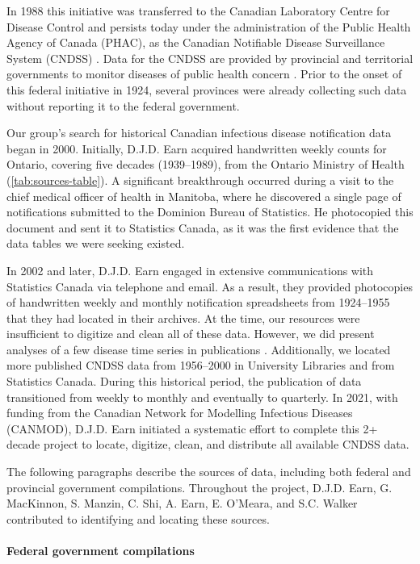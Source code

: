\documentclass[12pt]{article}
\begin{document}
In 1988 this initiative was transferred to the Canadian Laboratory Centre for Disease Control and persists today under the administration of the Public Health Agency of Canada (PHAC), as the Canadian Notifiable Disease Surveillance System (CNDSS) \cite{totten2019updates}. Data for the CNDSS are provided by provincial and territorial governments to monitor diseases of public health concern \cite{totten2019updates}. Prior to the onset of this federal initiative in 1924, several provinces were already collecting such data without reporting it to the federal government.

Our group's search for historical Canadian infectious disease notification data began in 2000. Initially, D.J.D. Earn acquired handwritten weekly counts for Ontario, covering five decades (1939--1989), from the Ontario Ministry of Health (\cref{tab:sources-table}). A significant breakthrough occurred during a visit to the chief medical officer of health in Manitoba, where he discovered a single page of notifications submitted to the Dominion Bureau of Statistics. He photocopied this document and sent it to Statistics Canada, as it was the first evidence that the data tables we were seeking existed.

In 2002 and later, D.J.D. Earn engaged in extensive communications with Statistics Canada via telephone and email. As a result, they provided photocopies of handwritten weekly and monthly notification spreadsheets from 1924--1955 that they had located in their archives. At the time, our resources were insufficient to digitize and clean all of these data. However, we did present analyses of a few disease time series in publications \cite{BaucEarn03,Hook+11}. Additionally, we located more published CNDSS data from 1956--2000 in University Libraries and from Statistics Canada. During this historical period, the publication of data transitioned from weekly to monthly and eventually to quarterly. In 2021, with funding from the Canadian Network for Modelling Infectious Diseases (CANMOD), D.J.D. Earn initiated a systematic effort to complete this 2+ decade project to locate, digitize, clean, and distribute all available CNDSS data.

The following paragraphs describe the sources of data, including both federal and provincial government compilations. Throughout the project, D.J.D. Earn, G. MacKinnon, S. Manzin, C. Shi, A. Earn, E. O'Meara, and S.C. Walker contributed to identifying and locating these sources.

\paragraph*{Federal government compilations}
\end{document}
